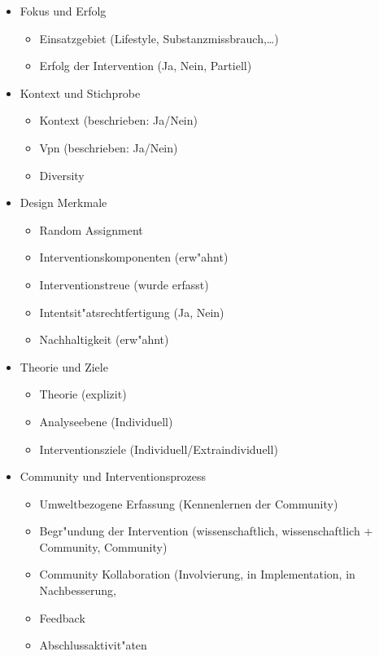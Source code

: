 \begin{itemize}
        \item Fokus und Erfolg
                \begin{itemize}
                        \item Einsatzgebiet (Lifestyle, Substanzmissbrauch,\ldots)
                        \item Erfolg der Intervention (Ja, Nein, Partiell)
                \end{itemize}
        \item Kontext und Stichprobe
                \begin{itemize}
                        \item Kontext (beschrieben: Ja/Nein)
                        \item Vpn (beschrieben: Ja/Nein)
                        \item Diversity
                \end{itemize}
        \item Design Merkmale
                \begin{itemize}
                        \item Random Assignment
                        \item Interventionskomponenten (erw"ahnt)
                        \item Interventionstreue (wurde erfasst)
                        \item Intentsit"atsrechtfertigung (Ja, Nein)
                        \item Nachhaltigkeit (erw"ahnt)
                \end{itemize}
        \item Theorie und Ziele
                \begin{itemize}
                        \item Theorie (explizit)
                        \item Analyseebene (Individuell)
                        \item Interventionsziele (Individuell/Extraindividuell)
                \end{itemize}
        \item Community und Interventionsprozess
                \begin{itemize}
                        \item Umweltbezogene Erfassung (Kennenlernen der Community)
                        \item Begr"undung der Intervention (wissenschaftlich, wissenschaftlich + Community, Community)
                        \item Community Kollaboration (Involvierung, in Implementation, in Nachbesserung, 
                        \item Feedback
                        \item Abschlussaktivit"aten
                \end{itemize}
\end{itemize}

